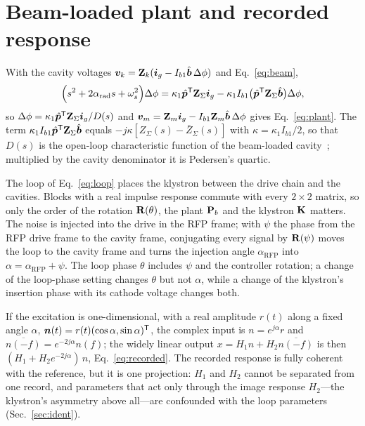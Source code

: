 \section{Beam-loaded plant and recorded response}\label{app:derivation}

With the cavity voltages $\bm{v}_k=\mathbf{Z}_k(\bm{i}_g-I_{b1}\hat{\bm{b}}\,\Delta\phi)$ and Eq.~\eqref{eq:beam},
\begin{equation}
\Bigl(s^2+2\alpha_\mathrm{rad} s+\omega_s^2\Bigr)\Delta\phi=\kappa_1\hat{\bm{p}}^\mathsf{T}\mathbf{Z}_\Sigma\bm{i}_g-\kappa_1I_{b1}\bigl(\hat{\bm{p}}^\mathsf{T}\mathbf{Z}_\Sigma\hat{\bm{b}}\bigr)\Delta\phi ,
\end{equation}
so $\Delta\phi=\kappa_1\hat{\bm{p}}^\mathsf{T}\mathbf{Z}_\Sigma\bm{i}_g/D(s)$ and $\bm{v}_m=\mathbf{Z}_m\bm{i}_g-I_{b1}\mathbf{Z}_m\hat{\bm{b}}\,\Delta\phi$ gives Eq.~\eqref{eq:plant}. The term $\kappa_1I_{b1}\hat{\bm{p}}^\mathsf{T}\mathbf{Z}_\Sigma\hat{\bm{b}}$ equals $-j\kappa[Z_\Sigma(s)-\bar Z_\Sigma(s)]$ with $\kappa=\kappa_1I_{b1}/2$, so that $D(s)$ is the open-loop characteristic function of the beam-loaded cavity~\cite{Pedersen1975}; multiplied by the cavity denominator it is Pedersen's quartic.

The loop of Eq.~\eqref{eq:loop} places the klystron between the drive chain and the cavities. Blocks with a real impulse response commute with every $2\times2$ matrix, so only the order of the rotation $\mathbf{R}(\theta)$, the plant $\mathbf{P}_b$ and the klystron $\mathbf{K}$ matters. The noise is injected into the drive in the RFP frame; with $\psi$ the phase from the RFP drive frame to the cavity frame, conjugating every signal by $\mathbf{R}(\psi)$ moves the loop to the cavity frame and turns the injection angle $\alpha_\mathrm{RFP}$ into $\alpha=\alpha_\mathrm{RFP}+\psi$. The loop phase $\theta$ includes $\psi$ and the controller rotation; a change of the loop-phase setting changes $\theta$ but not $\alpha$, while a change of the klystron's insertion phase with its cathode voltage changes both.

If the excitation is one-dimensional, with a real amplitude $r(t)$ along a fixed angle $\alpha$, $\bm{n}(t)=r(t)(\cos\alpha,\sin\alpha)^\mathsf{T}$, the complex input is $n=e^{j\alpha}r$ and $\overline{n(-f)}=e^{-2j\alpha}n(f)$; the widely linear output $x=H_1n+H_2\overline{n(-f)}$ is then $(H_1+H_2e^{-2j\alpha})\,n$, Eq.~\eqref{eq:recorded}. The recorded response is fully coherent with the reference, but it is one projection: $H_1$ and $H_2$ cannot be separated from one record, and parameters that act only through the image response $H_2$---the klystron's asymmetry above all---are confounded with the loop parameters (Sec.~\ref{sec:ident}).

